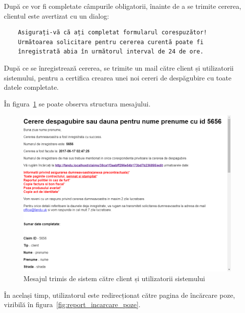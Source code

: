 	După ce vor fi completate câmpurile obligatorii, înainte de a se trimite cererea, clientul este avertizat cu un dialog:
	\begin{verbatim}
	Asigurați-vă că ați completat formularul corespuzător!
	Următoarea solicitare pentru cererea curentă poate fi
	înregistrată abia în următorul interval de 24 de ore.
	\end{verbatim}

	După ce se înregistrează cererea, se trimite un mail către client și utilizatorii sistemului, pentru a certifica crearea unei noi cereri de despăgubire cu toate datele completate.

	În figura~\ref{fig:message_new_claim} se poate observa structura mesajului.

	\begin{figure}
		\includegraphics[width=\linewidth]{../imagini/message_new_claim.png}
		\caption{Mesajul trimis de sistem către client și utilizatorii sistemului}
		\label{fig:message_new_claim}
	\end{figure}

	În același timp, utilizatorul este redirecționat către pagina de încărcare poze, vizibilă în figura~\ref{fig:report_incarcare_poze}.

